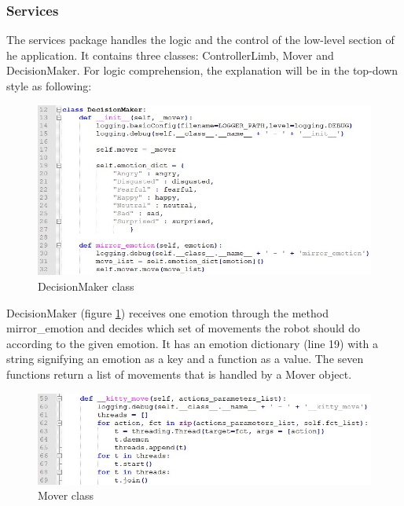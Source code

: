 \documentclass[runningheads,a4paper,12pt]{report}
\begin{document}
\subsubsection{Services}
The services package handles the logic and the control of the low-level section of he application. It contains three classes: ControllerLimb, Mover and DecisionMaker. For logic comprehension, the explanation will be in the top-down style as following: 

\begin{figure}
	\centering

  	\includegraphics[width=\linewidth]{./images/3_decision_maker}\hfill

    \caption{DecisionMaker class}  
    \label{fig:decision-maker}
\end{figure}

DecisionMaker (figure \ref{fig:decision-maker}) receives one emotion through the method mirror\_emotion and decides which set of movements the robot should do according to the given emotion. It has an emotion dictionary (line 19) with a string signifying an emotion as a key and  a function as a value. The seven functions return a list of movements that is handled by a Mover object. 

\begin{figure}
	\centering

  	\includegraphics[width=\linewidth]{./images/3_mover}\hfill

    \caption{Mover class}  
    \label{fig:mover}
\end{figure}
\end{document}
